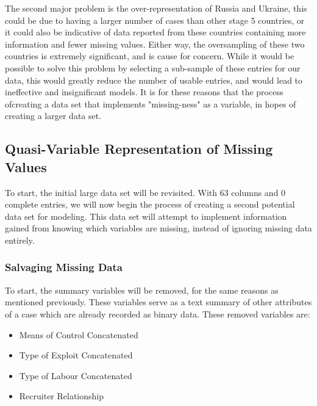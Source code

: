 \documentclass{article} %
\begin{document}
The second major problem is the over-representation of Russia and Ukraine, this could be due to having a larger number of cases than other stage 5 countries, or it could also be indicative of data reported from these countries containing more information and fewer missing values. Either way, the oversampling of these two countries is extremely significant, and is cause for concern. While it would be possible to solve this problem by selecting a sub-sample of these entries for our data, this would greatly reduce the number of usable entries, and would lead to ineffective and insignificant models. It is for these reasons that the process ofcreating a data set that implements "missing-ness" as a variable, in hopes of creating a larger data set. 

\subsection{Quasi-Variable Representation of Missing Values}

To start, the initial large data set will be revisited. With 63 columns and 0 complete entries, we will now begin the process of creating a second potential data set for modeling. This data set will attempt to implement information gained from knowing which variables are missing, instead of ignoring missing data entirely.

\subsubsection{Salvaging Missing Data} \label{Salvage}

To start, the summary variables will be removed, for the same reasons as mentioned previously. These variables serve as a text summary of other attributes of a case which are already recorded as binary data. These removed variables are:

\begin{multicols}{2}
	\begin{itemize}
		\item Means of Control Concatenated
		\item Type of Exploit Concatenated
		\item Type of Labour Concatenated
		\item Recruiter Relationship
	\end{itemize}
\end{multicols}
\end{document}
